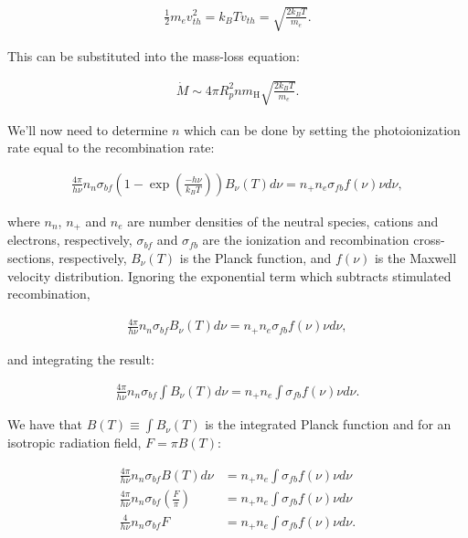 \documentclass[12pt]{article}
\begin{document}
\begin{equation*}
\begin{split}
\frac{1}{2}m_ev_{th}^2 = k_BT
v_{th} = \sqrt{\frac{2k_BT}{m_e}}.
\end{split}
\end{equation*}

This can be substituted into the mass-loss equation:

\begin{align*}
\dot{M} \sim 4\pi R_p^2nm_\mathrm{H}\sqrt{\frac{2k_BT}{m_e}}.
\end{align*}

We'll now need to determine $n$ which can be done by setting the photoionization rate equal to the recombination rate:

\begin{align*}
\frac{4\pi}{h\nu}n_n\sigma_{bf}\left(1-\exp\left(\frac{-h\nu}{k_BT}\right)\right)B_\nu(T)d\nu = n_+n_e\sigma_{fb}f(\nu)\nu d\nu,
\end{align*}

where $n_n$, $n_+$ and $n_e$ are number densities of the neutral species, cations and electrons, respectively, $\sigma_{bf}$ and $\sigma_{fb}$ are the ionization and recombination cross-sections, respectively, $B_\nu(T)$ is the Planck function, and $f(\nu)$ is the Maxwell velocity distribution. Ignoring the exponential term which subtracts stimulated recombination,

\begin{align*}
\frac{4\pi}{h\nu}n_n\sigma_{bf}B_\nu(T)d\nu = n_+n_e\sigma_{fb}f(\nu)\nu d\nu,
\end{align*}

and integrating the result:

\begin{align*}
\frac{4\pi}{h\nu}n_n\sigma_{bf}\int B_\nu(T)d\nu = n_+n_e\int\sigma_{fb}f(\nu)\nu d\nu.
\end{align*}

We have that $B(T) \equiv \int B_\nu(T)$ is the integrated Planck function and for an isotropic radiation field, $F = \pi B(T)$:

\begin{equation*}
\begin{split}
\frac{4\pi}{h\nu}n_n\sigma_{bf}B(T)d\nu &= n_+n_e\int\sigma_{fb}f(\nu)\nu d\nu\\
\frac{4\pi}{h\nu}n_n\sigma_{bf}\left(\frac{F}{\pi}\right) &= n_+n_e\int\sigma_{fb}f(\nu)\nu d\nu\\
\frac{4}{h\nu}n_n\sigma_{bf}F &= n_+n_e\int\sigma_{fb}f(\nu)\nu d\nu.
\end{split}
\end{equation*}
\end{document}
